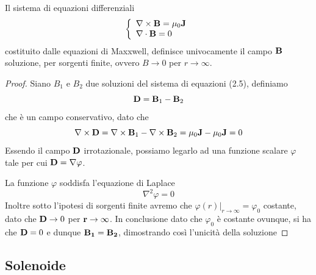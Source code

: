 \begin{theorem}
	Il sistema di equazioni differenziali 
	\begin{equation}
		\left \{ \begin{array}{l}
			\nabla \times \bold{B} = \mu_0 \bold{J} \\
			\nabla \cdot \bold{B} = 0
		\end{array}\right.
	\end{equation}
costituito dalle equazioni di Maxxwell, definisce univocamente il campo $\bold{B}$ soluzione, per sorgenti finite, ovvero $B \to 0$ per $r \to \infty$.
\end{theorem}
\begin{proof}
	Siano $B_1$ e $B_2$ due soluzioni del sistema di equazioni (2.5), definiamo
	\begin{equation*}
		\bold{D} = \bold{B}_{1} - \bold{B}_2
	\end{equation*}
che \`e un campo conservativo, dato che 
\begin{equation*}
	\nabla \times \bold{D} = \nabla \times \bold{B}_1 - \nabla \times \bold{B}_2 = \mu_0\bold{J} -\mu_0 \bold{J} =0
\end{equation*}
Essendo il campo $\bold{D}$ irrotazionale, possiamo legarlo ad una funzione scalare $\varphi$ tale per cui $\bold{D} = \nabla \varphi$.

La funzione $\varphi$ soddisfa l'equazione di Laplace 
\begin{equation*}
	\nabla^2 \varphi =0
\end{equation*}
Inoltre sotto l'ipotesi di sorgenti finite avremo che $\varphi(r)|_{r \to \infty} = \varphi_0$ costante, dato che $\bold{D} \to 0 $ per $\bold{r} \to \infty$. In conclusione dato che $\varphi_0$ \`e costante ovunque, si ha che $\bold{D}=0$ e dunque $\bold{B_1} =\bold{B_2}$, dimostrando cos\`i l'unicit\`a della soluzione

\end{proof}

\subsection{Solenoide}

